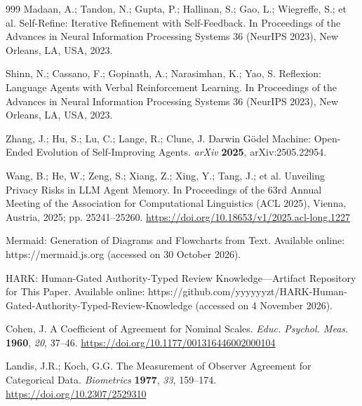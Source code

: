 \documentclass[computers,article,submit,moreauthors]{Definitions/mdpi}
\begin{document}
{\begin{thebibliography}{999}
Madaan, A.; Tandon, N.; Gupta, P.; Hallinan, S.; Gao, L.; Wiegreffe, S.; et al. Self-Refine: Iterative Refinement with Self-Feedback. In Proceedings of the Advances in Neural Information Processing Systems 36 (NeurIPS 2023), New Orleans, LA, USA, 2023.

Shinn, N.; Cassano, F.; Gopinath, A.; Narasimhan, K.; Yao, S. Reflexion: Language Agents with Verbal Reinforcement Learning. In Proceedings of the Advances in Neural Information Processing Systems 36 (NeurIPS 2023), New Orleans, LA, USA, 2023.

Zhang, J.; Hu, S.; Lu, C.; Lange, R.; Clune, J. Darwin G\"odel Machine: Open-Ended Evolution of Self-Improving Agents. \emph{arXiv} {\bf 2025}, arXiv:2505.22954.

Wang, B.; He, W.; Zeng, S.; Xiang, Z.; Xing, Y.; Tang, J.; et al. Unveiling Privacy Risks in LLM Agent Memory. In Proceedings of the 63rd Annual Meeting of the Association for Computational Linguistics (ACL 2025), Vienna, Austria, 2025; pp. 25241--25260. \url{https://doi.org/10.18653/v1/2025.acl-long.1227}

Mermaid: Generation of Diagrams and Flowcharts from Text. Available online: https://mermaid.js.org (accessed on 30 October 2026).

HARK: Human-Gated Authority-Typed Review Knowledge---Artifact Repository for This Paper. Available online: https://github.com/yyyyyyzt/HARK-Human-Gated-Authority-Typed-Review-Knowledge (accessed on 4 November 2026).

Cohen, J. A Coefficient of Agreement for Nominal Scales. {\em Educ. Psychol. Meas.} {\bf 1960}, {\em 20}, 37--46. \url{https://doi.org/10.1177/001316446002000104}

Landis, J.R.; Koch, G.G. The Measurement of Observer Agreement for Categorical Data. {\em Biometrics} {\bf 1977}, {\em 33}, 159--174. \url{https://doi.org/10.2307/2529310}

\end{thebibliography}
}
\end{document}

